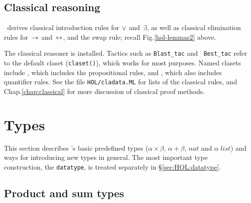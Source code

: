 \subsection{Classical reasoning}

\HOL\ derives classical introduction rules for $\vee$ and~$\exists$, as
well as classical elimination rules for~$\rightarrow$ and~$\leftrightarrow$, and the swap
rule; recall Fig.\ts\ref{hol-lemmas2} above.

The classical reasoner is installed.  Tactics such as \texttt{Blast_tac} and {\tt
Best_tac} refer to the default claset ({\tt claset()}), which works for most
purposes.  Named clasets include , which includes the
propositional rules, and , which also includes quantifier
rules.  See the file \texttt{HOL/cladata.ML} for lists of the classical rules,
and %
{Chap.\ts\ref{chap:classical}} for more discussion of classical proof methods.


\section{Types}\label{sec:HOL:Types}
This section describes \HOL's basic predefined types ($\alpha \times
\beta$, $\alpha + \beta$, $nat$ and $\alpha \; list$) and ways for
introducing new types in general.  The most important type
construction, the \texttt{datatype}, is treated separately in
\S\ref{sec:HOL:datatype}.


\subsection{Product and sum types}
\label{subsec:prod-sum}

